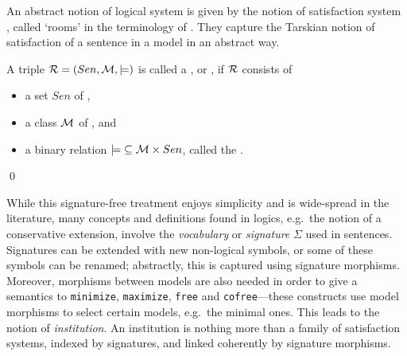 \documentclass[10pt,fleqn,final]{scrreprt}
\newcommand*{\syntax}[1]{\texttt{#1}}
\newenvironment{definitions}[0]{\medskip }{}
\begin{document}
\begin{definitions}
 An abstract notion of logical system is given by  the notion of
satisfaction system \cite{carnielli2008analysis}, called `rooms' in
the terminology of \cite{CharPar}. They capture the Tarskian notion of
satisfaction of a sentence in a model in an abstract way.

\begin{definition}\label{def:room}
A triple ${\cal R}=(Sen,{{\cal M},\models)}$  is called a  , or , if ${\cal R}$  consists of
\begin{itemize}
\item a set $Sen$ of ,
\item a class
${\cal M}$ of , and
\item a binary relation
${\models}\subseteq {\cal M} \times Sen$, called the .
\end{itemize}\qed
\end{definition}


While this signature-free treatment enjoys simplicity and is wide-spread in the literature, many 
concepts and definitions found in logics, e.g.\ the notion of a conservative extension, involve the
\emph{vocabulary} or \emph{signature} $\Sigma$ \label{vocabulary} used in sentences.  Signatures 
can be extended with new non-logical symbols, or some of these symbols can be renamed; abstractly, 
this is captured using signature morphisms. Moreover,  morphisms
between models are also needed in order to give a semantics to \syntax{minimize},
\syntax{maximize}, \syntax{free} and \syntax{cofree}---these constructs
use model morphisms to select certain models, e.g.\ the minimal ones.
This leads to the notion of \emph{institution}. An institution
is nothing more than a family of satisfaction systems, indexed by
signatures, and linked coherently by signature morphisms.



\end{definitions}
\end{document}
